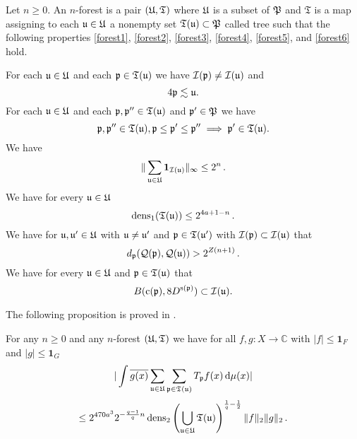 Let $n\ge 0$.
An $n$-forest is a pair $({\mathfrak U}, \mathfrak{T})$
where ${\mathfrak U}$ is a subset of ${\mathfrak P}$
and $\mathfrak{T}$ is a map assigning to
each ${\mathfrak u}\in {\mathfrak U}$ a nonempty set ${\mathfrak T} ({\mathfrak u})\subset {\mathfrak P}$ called tree
such that the following properties
\eqref{forest1}, \eqref{forest2},
\eqref{forest3},
\eqref{forest4},
\eqref{forest5}, and
\eqref{forest6}
hold.

For each ${\mathfrak u}\in {\mathfrak U}$ and each ${\mathfrak p}\in {\mathfrak T}({\mathfrak u})$
we have ${\mathcal{I}}({\mathfrak p}) \ne {\mathcal{I}}({\mathfrak u})$ and
\begin{equation}\label{forest1}
    4{\mathfrak p}\lesssim {\mathfrak u}.
\end{equation}
For each ${\mathfrak u} \in {\mathfrak U}$ and each ${\mathfrak p},{\mathfrak p}''\in {\mathfrak T}({\mathfrak u})$ and ${\mathfrak p}'\in {\mathfrak P}$
we have
\begin{equation}\label{forest2}
    {\mathfrak p}, {\mathfrak p}'' \in \mathfrak{T}({\mathfrak u}), {\mathfrak p} \leq {\mathfrak p}' \leq {\mathfrak p}'' \implies {\mathfrak p}' \in \mathfrak{T}({\mathfrak u}).
\end{equation}
We have
\begin{equation}\label{forest3}
   \|\sum_{{\mathfrak u}\in {\mathfrak U}} \mathbf{1}_{{\mathcal{I}}({\mathfrak u})}\|_\infty \leq 2^n\,.
\end{equation}
We have for every ${\mathfrak u}\in {\mathfrak U}$
\begin{equation}\label{forest4}
    \operatorname{\operatorname{dens}}_1({\mathfrak T}({\mathfrak u}))\le 2^{4a + 1-n}\, .
\end{equation}
We have for ${\mathfrak u}, {\mathfrak u}'\in {\mathfrak U}$ with ${\mathfrak u}\neq {\mathfrak u}'$ and ${\mathfrak p}\in {\mathfrak T}({\mathfrak u}')$ with ${\mathcal{I}}({\mathfrak p})\subset {\mathcal{I}}({\mathfrak u})$ that
\begin{equation}\label{forest5}
    d_{{\mathfrak p}}({\mathcal{Q}}({\mathfrak p}), {\mathcal{Q}}({\mathfrak u}))>2^{Z(n+1)}\, .
\end{equation}
We have for every ${\mathfrak u}\in {\mathfrak U}$ and ${\mathfrak p}\in {\mathfrak T}({\mathfrak u})$ that
\begin{equation}\label{forest6}
    B({\mathrm{c}}({\mathfrak p}), 8D^{{\mathrm{s}}({\mathfrak p})})\subset {\mathcal{I}}({\mathfrak u}).
\end{equation}


The following proposition is proved in .
\begin{proposition}
\label{forest-operator}
\leanok
{}
For any $n\ge 0$ and any $n$-forest $({\mathfrak U},{\mathfrak T})$ we have for all $f,g: X \to \mathbb{C}$ with $|f| \le \mathbf{1}_F$ and $|g| \le \mathbf{1}_G$
$$
    | \int \overline{g(x)} \sum_{{\mathfrak u}\in {\mathfrak U}} \sum_{{\mathfrak p}\in {\mathfrak T}({\mathfrak u})} T_{{\mathfrak p}} f(x) \, \mathrm{d}\mu(x)|
$$
$$
    \le
    2^{470a^3}2^{-\frac{q-1}{q} n} \operatorname{\operatorname{dens}}_2\left(\bigcup_{{\mathfrak u}\in {\mathfrak U}}{\mathfrak T}({\mathfrak u})\right)^{\frac{1}{q}-\frac{1}{2}} \|f\|_2 \|g\|_2 \,.
$$
\end{proposition}

